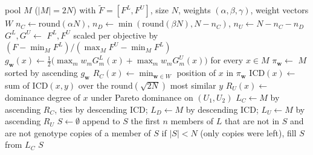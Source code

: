 \begin{algorithm}[!htbp]
\caption{\textsc{Select}: three-tier environmental selection with a Tchebycheff Rank C}
\label{alg:sel}
\begin{algorithmic}[1]
\Require pool $M$ ($|M| = 2N$) with $\tilde{F} = [F^L, F^U]$, size $N$, weights $(\alpha, \beta, \gamma)$, weight vectors $W$
\State $n_C \gets \mathrm{round}(\alpha N)$, \; $n_D \gets \min(\mathrm{round}(\beta N), N - n_C)$, \; $n_U \gets N - n_C - n_D$
\State $G^L, G^U \gets$ $F^L, F^U$ scaled per objective by $(F - \min_M F^L) / (\max_M F^U - \min_M F^L)$
  \State $g_{\mathbf{w}}(x) \gets \tfrac{1}{2}\big(\max_m w_m G^L_m(x) + \max_m w_m G^U_m(x)\big)$ for every $x \in M$
  \State $\pi_{\mathbf{w}} \gets$ $M$ sorted by ascending $g_{\mathbf{w}}$
\EndFor
\State $R_C(x) \gets \min_{\mathbf{w} \in W}$ position of $x$ in $\pi_{\mathbf{w}}$ 
\State $\mathrm{ICD}(x) \gets$ sum of $\mathrm{ICD}(x, y)$ over the $\mathrm{round}(\sqrt{2N})$ most similar $y$ 
\State $R_U(x) \gets$ dominance degree of $x$ under Pareto dominance on $(U_1, U_2)$ 
\State $L_C \gets M$ by ascending $R_C$, ties by descending ICD; \; $L_D \gets M$ by descending ICD; \; $L_U \gets M$ by ascending $R_U$
\State $S \gets \emptyset$
  \State append to $S$ the first $n$ members of $L$ that are not in $S$ and are not genotype copies of a member of $S$
\EndFor
\State if $|S| < N$ (only copies were left), fill $S$ from $L_C$
\State \Return $S$
\end{algorithmic}
\end{algorithm}

